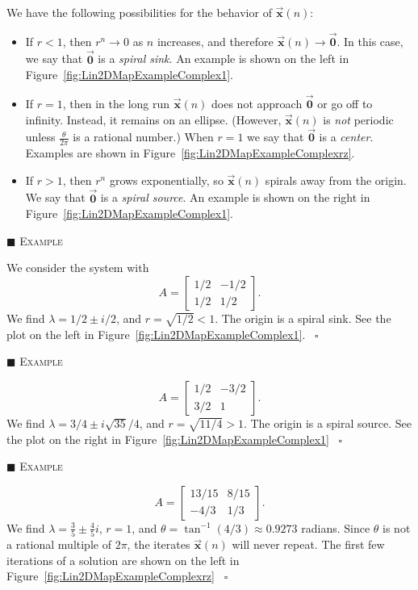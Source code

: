 \documentclass[reqno]{immbook}
\newcommand{\BX}{\vec{\textbf{x}}}
\newcommand{\BZero}{\vec{\textbf{0}}}  %
\numberwithin{equation}{chapter}
\numberwithin{question}{section}
\numberwithin{theorem}{chapter}
\numberwithin{figure}{chapter}
\theoremstyle{definition}
\newenvironment{xexample}%
{%

\medskip\noindent\addtocounter{example}{1}$\blacksquare$ \textsc{Example \theexample}\hspace*{1em}%
}%
{%
~\hfill$\square$

\medskip
}
\begin{document}
We have the following possibilities
for the behavior of $\BX(n)$:
\begin{itemize}
\item
If $r < 1$, then $r^n \rightarrow 0$ as $n$ increases,
and therefore $\BX(n)\rightarrow \BZero$.
In this case, we say that $\BZero$ is a \emph{spiral sink}.
An example is shown on the left in Figure~\ref{fig:Lin2DMapExampleComplex1}.
\item
If $r=1$, then in the long run $\BX(n)$ does not approach
$\BZero$ or go off to infinity. Instead, it remains on an ellipse.
(However, $\BX(n)$ is \emph{not} periodic unless
$\frac{\theta}{2\pi}$ is a rational number.)
When $r=1$ we say that $\BZero$ is a \emph{center}.
Examples are shown in Figure~\ref{fig:Lin2DMapExampleComplexrz}.
\item
If $r > 1$, then $r^n$ grows exponentially, so $\BX(n)$
spirals away from the origin.  We say that $\BZero$ is 
a \emph{spiral source}.
An example is shown on the right in 
Figure~\ref{fig:Lin2DMapExampleComplex1}.
\end{itemize}

\begin{xexample}
We consider the system with
\begin{equation}
  A = \begin{bmatrix} 1/2 & -1/2\\ 1/2 & 1/2\end{bmatrix}.
\end{equation}
We find $\lambda = 1/2 \pm i/2$, and $r = \sqrt{1/2} < 1$.
The origin is a spiral sink.
See the plot on the left in Figure~\ref{fig:Lin2DMapExampleComplex1}.
\end{xexample}

\begin{xexample}
\begin{equation}
  A = \begin{bmatrix} 1/2 & -3/2\\ 3/2 & 1\end{bmatrix}.
\end{equation}
We find $\lambda = 3/4 \pm i\sqrt{35}/4$, and $r = \sqrt{11/4} > 1$.
The origin is a spiral source.
See the plot on the right in Figure~\ref{fig:Lin2DMapExampleComplex1}
\end{xexample}

\begin{xexample}
\begin{equation}
A = \begin{bmatrix} 13/15 & 8/15 \\ -4/3 & 1/3 \end{bmatrix}.
\end{equation}
We find $\lambda = \frac{3}{5}\pm \frac{4}{5}i$, $r=1$,
and $\theta = \tan^{-1}(4/3)\approx 0.9273$ radians.
Since $\theta$ is not a rational multiple of $2\pi$,
the iterates $\BX(n)$ will never repeat.
The first few iterations of a solution are shown
on the left
in Figure~\ref{fig:Lin2DMapExampleComplexrz}
\end{xexample}
\end{document}
